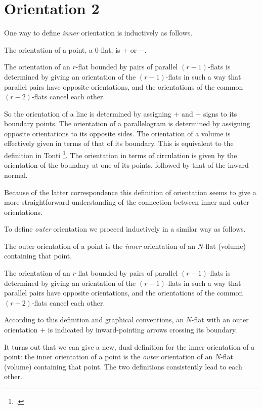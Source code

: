 \documentclass[\ifafour a4paper,12pt,\else a5paper,10pt,\fi%
onecolumn,oneside,article,%
british%
]{memoir}
\theoremstyle{remark}
\theoremstyle{innote}
\newcommand*{\citep}{\footcites}
\renewcommand*{\|}[1][]{\nonscript\:#1\vert\nonscript\:\mathopen{}}
\newcommand*{\chap}{ch.}%
\begin{document}
\section{Orientation 2}
\label{sec:orientation2}

One way to define \emph{inner} orientation is inductively as follows.

The orientation of a point, a 0-flat, is $+$ or $-$.

The orientation of an $r$-flat bounded by pairs of parallel $(r-1)$-flats
is determined by giving an orientation of the $(r-1)$-flats in such a way
that parallel pairs have opposite orientations, and the orientations of the
common $(r-2)$-flats cancel each other.

So the orientation of a line is determined by assigning $+$ and $-$ signs
to its boundary points. The orientation of a parallelogram is determined by
assigning opposite orientations to its opposite sides. The orientation of a
volume is effectively given in terms of that of its boundary. This is
equivalent to the definition in Tonti \citep[\chap~3]{tonti2013}. The
orientation in terms of circulation is given by the orientation of the
boundary at one of its points, followed by that of the inward normal.

Because of the latter correspondence this definition of orientation seems
to give a more straightforward understanding of the connection between
inner and outer orientations.

\medskip

To define \emph{outer} orientation we proceed inductively in a similar way
as follows.

The outer orientation of a point is the \emph{inner} orientation of an
$N$-flat (volume) containing that point.

The orientation of an $r$-flat bounded by pairs of parallel $(r-1)$-flats
is determined by giving an orientation of the $(r-1)$-flats in such a way
that parallel pairs have opposite orientations, and the orientations of the
common $(r-2)$-flats cancel each other.

According to this definition and graphical conventions, an $N$-flat with an
outer orientation $+$ is indicated by inward-pointing arrows crossing its
boundary.

\medskip

It turns out that we can give a new, dual definition for the inner
orientation of a point: the inner orientation of a point is the
\emph{outer} orientation of an $N$-flat (volume) containing that point. The
two definitions consistently lead to each other.
\end{document}
